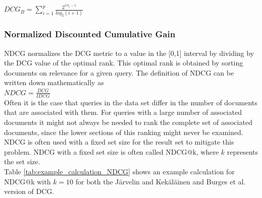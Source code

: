 $DCG_{B} = \sum\nolimits_{i=1}^p \frac{2^{rel_i-1}}{log_2(i+1)}$\\

\subsubsection{Normalized Discounted Cumulative Gain}
\ac{NDCG} normalizes the \ac{DCG} metric to a value in the [0,1] interval by dividing by the \ac{DCG} value of the optimal rank. This optimal rank is obtained by sorting documents on relevance for a given query. The definition of \ac{NDCG} can be written down mathematically as\\

$NDCG = \frac{DCG}{IDCG}$\\

Often it is the case that queries in the data set differ in the number of documents that are associated with them. For queries with a large number of associated documents it might not always be needed to rank the complete set of associated documents, since the lower sections of this ranking might never be examined. \acl{NDCG} is often used with a fixed set size for the result set to mitigate this problem. \ac{NDCG} with a fixed set size is often called \ac{NDCG}@k, where $k$ represents the set size.\\

Table \ref{tab:example_calculation_NDCG} shows an example calculation for \ac{NDCG}@k with $k=10$ for both the J{\"a}rvelin and Kek{\"a}l{\"a}inen \cite{Jarvelin2002} and Burges et al. \cite{Burges2005} version of \ac{DCG}.\\

